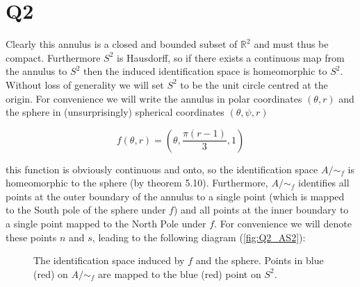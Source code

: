 \documentclass{article}
\begin{document}
\section*{Q2}
Clearly this annulus is a closed and bounded subset of 
$\mathbb{R}^2$ and must thus be compact. Furthermore $S^2$ is Hausdorff, so if there exists a 
continuous map from the annulus to $S^2$ then the induced identification space is homeomorphic to 
$S^2$. Without loss of generality we will set $S^2$ to be the unit circle centred at the origin. 
For convenience we will write the annulus in polar coordinates $(\theta, r)$ and the sphere in (unsurprisingly) 
spherical coordinates $(\theta, \psi, r)$

\begin{equation}
    f(\theta, r) = \left(\theta, \frac{\pi (r-1)}{3}, 1\right)
\end{equation}

this function is obviously continuous and onto, so the identification space $A/\sim_f$ is 
homeomorphic to the sphere (by theorem 5.10). Furthermore, $A/\sim_f$ identifies 
all points at the outer boundary of the annulus to a single point (which is mapped to the 
South pole of the sphere under $f$) and all points at the inner 
boundary to a single point mapped to the North Pole under $f$. For convenience we will denote 
these points $n$ and $s$, leading to the following diagram (\autoref{fig:Q2_AS2}):

\begin{figure}[H]
    \centering
      \caption{The identification space induced by $f$ and the sphere. Points in blue (red) on $A/ \sim_f$ are mapped 
      to the blue (red) point on $S^2$.}
      \label{fig:Q2_AS2}
\end{figure}
\end{document}
